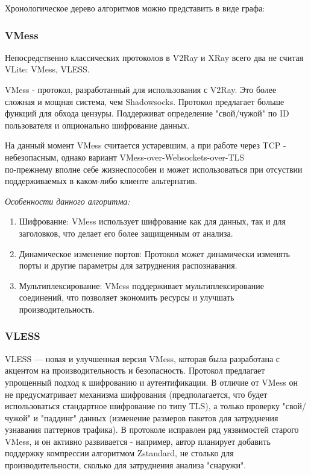 \documentclass[utf8,14pt,a4paper,oneside,russian]{book}
\begin{document}
Хронологическое дерево алгоритмов можно представить в виде графа:


\subsubsection{VMess}
Непосредственно классических протоколов в V2Ray и XRay всего два не считая VLite: VMess, VLESS.

VMess - протокол, разработанный для использования с V2Ray. Это более сложная и мощная система, чем Shadowsocks. Протокол предлагает больше
функций для обхода цензуры. Поддерживат определение "свой/чужой" по ID пользователя и опционально шифрование данных.

На данный момент VMess считается устаревшим, а при работе через TCP - небезопасным, однако вариант VMess-over-Websockets-over-TLS\\
по-прежнему вполне себе жизнеспособен и может использоваться при отсуствии поддерживаемых в каком-либо клиенте альтернатив.

\textit{Особенности данного алгоритма:}
\begin{enumerate}
    \item Шифрование: VMess использует шифрование как для данных, так и для заголовков, что делает его более защищенным от анализа.
    \item Динамическое изменение портов: Протокол может динамически изменять порты и другие параметры для затруднения распознавания.
    \item Мультиплексирование: VMess поддерживает мультиплексирование соединений, что позволяет экономить ресурсы и улучшать производительность.
\end{enumerate}


\subsubsection{VLESS}
VLESS — новая и улучшенная версия VMess, которая была разработана с акцентом на производительность и безопасность.
Протокол предлагает упрощенный подход к шифрованию и аутентификации. В отличие от VMess он не предусматривает механизма шифрования
(предполагается, что будет использоваться стандартное шифрование по типу TLS), а только проверку "свой/чужой" и "паддинг" данных
(изменение размеров пакетов для затруднения узнавания паттернов трафика). В протоколе исправлен ряд уязвимостей старого VMess,
и он активно развивается - например, автор планирует добавить поддержку компрессии алгоритмом Zstandard, не столько для производительности,
сколько для затруднения анализа "снаружи".
\end{document}
